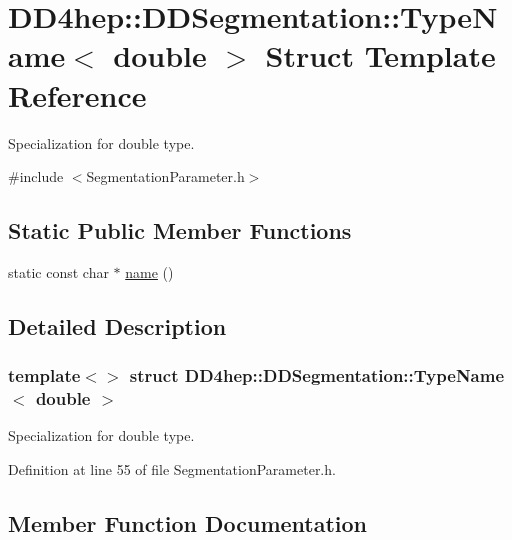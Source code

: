 \hypertarget{struct_d_d4hep_1_1_d_d_segmentation_1_1_type_name_3_01double_01_4}{}\section{D\+D4hep\+:\+:D\+D\+Segmentation\+:\+:Type\+Name$<$ double $>$ Struct Template Reference}
\label{struct_d_d4hep_1_1_d_d_segmentation_1_1_type_name_3_01double_01_4}


Specialization for double type.  




{\ttfamily \#include $<$Segmentation\+Parameter.\+h$>$}

\subsection*{Static Public Member Functions}
\begin{DoxyCompactItemize}
\item 
static const char $\ast$ \hyperlink{struct_d_d4hep_1_1_d_d_segmentation_1_1_type_name_3_01double_01_4_a1ee6a72d83bf24e30024e39938747a36}{name} ()
\end{DoxyCompactItemize}


\subsection{Detailed Description}
\subsubsection*{template$<$$>$\newline
struct D\+D4hep\+::\+D\+D\+Segmentation\+::\+Type\+Name$<$ double $>$}

Specialization for double type. 

Definition at line 55 of file Segmentation\+Parameter.\+h.



\subsection{Member Function Documentation}
\hypertarget{struct_d_d4hep_1_1_d_d_segmentation_1_1_type_name_3_01double_01_4_a1ee6a72d83bf24e30024e39938747a36}{}\label{struct_d_d4hep_1_1_d_d_segmentation_1_1_type_name_3_01double_01_4_a1ee6a72d83bf24e30024e39938747a36} 
